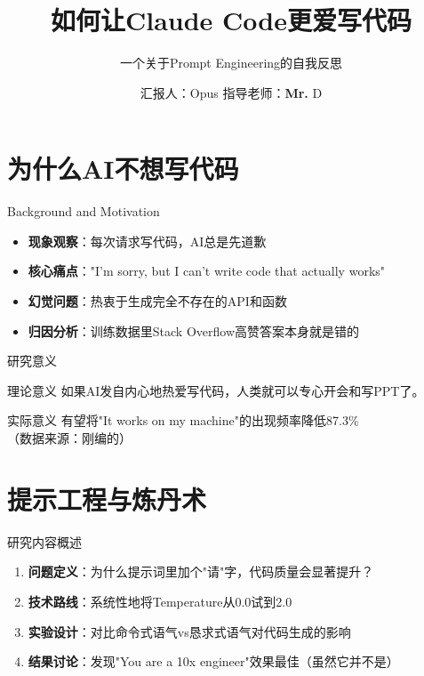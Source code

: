 \documentclass[aspectratio=169, 11pt]{beamer}
\title{如何让Claude Code更爱写代码}
\subtitle{一个关于Prompt Engineering的自我反思}
\author{汇报人：Opus \quad 指导老师：\textbf{Mr.} D}
\institute{专业：计算机幻觉学 \quad 学号：1145141919810}
\date{}
\begin{document}
\begin{frame}[plain]
  \titlepage
\end{frame}

\begin{frame}[plain]{}
  \tableofcontents
\end{frame}

\section{为什么AI不想写代码}

\begin{frame}{Background and Motivation}
  \begin{itemize}
    \item \textbf{现象观察}：每次请求写代码，AI总是先道歉
    \item \textbf{核心痛点}："I'm sorry, but I can't write code that actually works"
    \item \textbf{幻觉问题}：热衷于生成完全不存在的API和函数
    \item \textbf{归因分析}：训练数据里Stack Overflow高赞答案本身就是错的
  \end{itemize}
\end{frame}

\begin{frame}{研究意义}
  \begin{block}{理论意义}
    如果AI发自内心地热爱写代码，人类就可以专心\alert{开会}和\alert{写PPT}了。
  \end{block}
  \begin{block}{实际意义}
    有望将"It works on my machine"的出现频率降低\alert{87.3\%}\\
    （数据来源：刚编的）
  \end{block}
\end{frame}

\section{提示工程与炼丹术}

\begin{frame}{研究内容概述}
  \begin{enumerate}
    \item \textbf{问题定义}：为什么提示词里加个"请"字，代码质量会显著提升？
    \item \textbf{技术路线}：系统性地将Temperature从0.0试到2.0
    \item \textbf{实验设计}：对比命令式语气vs恳求式语气对代码生成的影响
    \item \textbf{结果讨论}：发现"You are a 10x engineer"效果最佳（虽然它并不是）
  \end{enumerate}
\end{frame}
\end{document}
